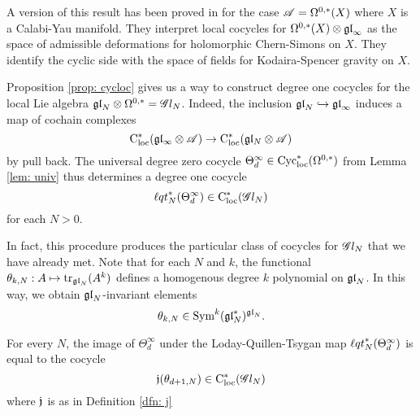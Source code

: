 
\begin{rmk}
A version of this result has been proved in \cite{CL1} for the case $\mathscr A = \Omega^{0,*}(X)$ where $X$ is a Calabi-Yau manifold.
They interpret local cocycles for $\Omega^{0,*}(X) \otimes {\mathfrak{gl}}_\infty$ as the space of admissible deformations for holomorphic Chern-Simons on $X$. 
They identify the cyclic side with the space of fields for Kodaira-Spencer gravity \cite{BCOV} on $X$.
\end{rmk}

Proposition \ref{prop: cycloc} gives us a way to construct degree one cocycles for the local Lie algebra ${\mathfrak{gl}}_N \otimes \Omega^{0,*} = \mathscr G l_{N}$. 
Indeed, the inclusion ${\mathfrak{gl}}_N \hookrightarrow {\mathfrak{gl}}_\infty$ induces a map of cochain complexes 
\[
{\rm C}_{\rm loc}^*(\mathfrak{g} \mathfrak{l}_\infty \otimes \mathscr A) \to {\rm C}_{\rm loc}^*(\mathfrak{g} \mathfrak{l}_N \otimes \mathscr A)
\]
by pull back. 
The universal degree zero cocycle $\Theta_d^\infty \in {\rm Cyc}_{\rm loc}^*(\Omega^{0,*})$ from Lemma \ref{lem: univ} thus determines a degree one cocycle 
\[
{\ell q t}^*_N(\Theta_d^\infty) \in {\rm C}_{\rm loc}^*(\mathscr G l_N)
\]
for each $N > 0$. 

In fact, this procedure produces the particular class of cocycles for $\mathscr G l_{N}$ that we have already met. 
Note that for each $N$ and $k$, the functional $\theta_{k,N} : A \mapsto {\rm tr}_{{\mathfrak{gl}}_N} (A^k)$ defines a homogenous degree $k$ polynomial on ${\mathfrak{gl}}_N$. 
In this way, we obtain ${\mathfrak{gl}}_N$-invariant elements
\[
\theta_{k,N} \in {\rm Sym}^{k}({\mathfrak{gl}}_N^*)^{{\mathfrak{gl}}_N} .
\]

\begin{lem}
For every $N$, the image of $\Theta_d^\infty$ under the Loday-Quillen-Tsygan map ${\ell q t}_N^*(\Theta_d^\infty)$ is equal to the cocycle
\[
\mathfrak j(\theta_{d+1, N}) \in {\rm C}_{\rm loc}^*(\mathscr G l_N)
\]
where $\mathfrak j$ is as in Definition \ref{dfn: j}
\end{lem}

